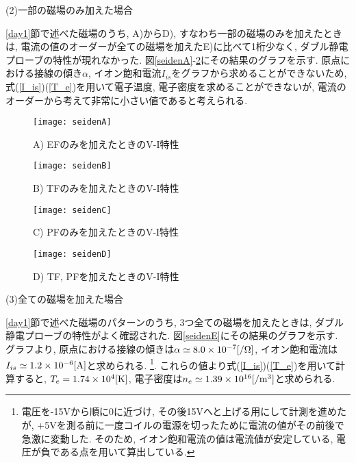 \documentclass[]{jsarticle}
\begin{document}
	(2)一部の磁場のみ加えた場合
	
		\ref{day1}節で述べた磁場のうち, A)からD), すなわち一部の磁場のみを加えたときは, 電流の値のオーダーが全ての磁場を加えたE)に比べて1桁少なく, ダブル静電プローブの特性が現れなかった. 図\ref{seidenA}-\ref{seidenD}にその結果のグラフを示す. 原点における接線の傾き$\alpha$, イオン飽和電流$I_{is}$をグラフから求めることができないため, 式(\ref{I_is})(\ref{T_e})を用いて電子温度, 電子密度を求めることができないが, 電流のオーダーから考えて非常に小さい値であると考えられる.
		
		\begin{figure}[htbp]
		\begin{minipage}{0.5\hsize}
			\begin{center}
				\texttt{[image: seidenA]}
				\caption{A) EFのみを加えたときのV-I特性}
				\label{seidenA}
			\end{center}
		\end{minipage}
		\begin{minipage}{0.5\hsize}
			\begin{center}
				\texttt{[image: seidenB]}
				\caption{B) TFのみを加えたときのV-I特性}
				\label{seidenB}
			\end{center}
		\end{minipage}
	\end{figure}
	
	\begin{figure}[htbp]
		\begin{minipage}{0.5\hsize}
			\begin{center}
				\texttt{[image: seidenC]}
				\caption{C) PFのみを加えたときのV-I特性}
				\label{seidenC}
			\end{center}
		\end{minipage}
		\begin{minipage}{0.5\hsize}
			\begin{center}
				\texttt{[image: seidenD]}
				\caption{D) TF, PFを加えたときのV-I特性}
				\label{seidenD}
			\end{center}
		\end{minipage}
	\end{figure}
		
		 
		
	(3)全ての磁場を加えた場合
	
		\ref{day1}節で述べた磁場のパターンのうち, 3つ全ての磁場を加えたときは, ダブル静電プローブの特性がよく確認された. 図\ref{seidenE}にその結果のグラフを示す. グラフより, 原点における接線の傾きは$\alpha \simeq 8.0\times10^{-7}[/\rm{\Omega}]$, イオン飽和電流は$I_{is} \simeq 1.2\times10^{-6}[\rm{A}]$と求められる. 
		\footnote{電圧を-15\rm{V}から順に0に近づけ, その後15\rm{V}へと上げる用にして計測を進めたが, +5\rm{V}を測る前に一度コイルの電源を切ったために電流の値がその前後で急激に変動した. そのため, イオン飽和電流の値は電流値が安定している, 電圧が負である点を用いて算出している. }. 
		これらの値より式(\ref{I_is})(\ref{T_e})を用いて計算すると, $T_e = 1.74 \times 10^4[\rm{K}]$, 電子密度は$n_e \simeq 1.39 \times 10^{16}[\rm{/m^3}]$と求められる. 
		
\end{document}
